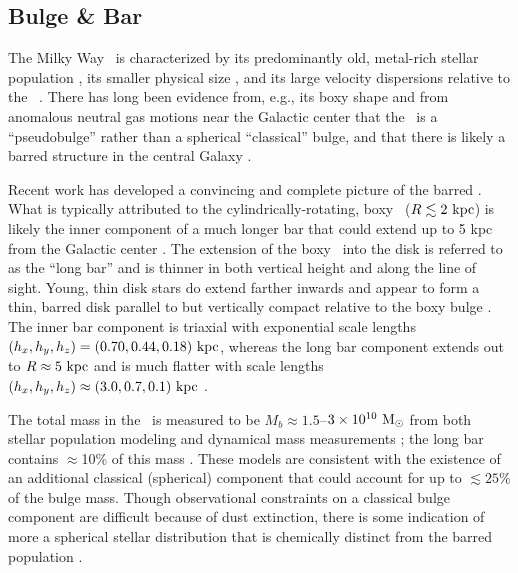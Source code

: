 \subsection{Bulge \& Bar}

The Milky Way \mwbulge\ is characterized by its predominantly old, metal-rich
stellar population \citep[$t_{\rm age} \gtrsim 10~{\rm Gyr}$, ${[{\rm Fe}/{\rm
H}]} \gtrsim -1$;][]{zoccali03}, its smaller physical size \citep[$R \lesssim
1$--$2~\kpc$;][]{binney97}, and its large velocity dispersions relative to the
\mwdisk\ \citep[$\sigma_v \sim 100~\kms$;][]{ness13b}. There has long been
evidence from, e.g., its boxy shape and from anomalous neutral gas motions near
the Galactic center that the \mwbulge\ is a ``pseudobulge'' rather than a
spherical ``classical'' bulge, and that there is likely a barred structure in
the central Galaxy \citep{blitz91, binney91, weiland94, binney97}.

Recent work has developed a convincing and complete picture of the barred
\mwbulge. What is typically attributed to the cylindrically-rotating, boxy
\mwbulge\ ($R \lesssim 2~\mathrm{kpc}$) is likely the inner component of a much longer
bar that could extend up to 5 kpc from the Galactic center \citep{wegg13,
wegg15}. The extension of the boxy \mwbulge\ into the disk is referred to as the
``long bar'' and is thinner in both vertical height and along the line of sight.
Young, thin disk stars do extend farther inwards and appear to form a thin,
barred disk parallel to but vertically compact relative to the boxy bulge
\citep{dekany15}. The inner bar component is triaxial with exponential scale
lengths $(h_x, h_y, h_z) = (0.70, 0.44, 0.18)~\mathrm{kpc}$, whereas the long bar
component extends out to $R\approx 5~\mathrm{kpc}$ and is much flatter with scale
lengths $(h_x, h_y, h_z) \approx (3.0, 0.7, 0.1)~\mathrm{kpc}$ \citep{wegg15}.


The total mass in the \mwbulge\ is measured to be $M_b \approx 1.5$--$3 \times
10^{10}~\mathrm{M}_\odot$ from both stellar population modeling \citep{dwek95, valenti15}
and dynamical mass measurements \citep{zhao95, portail15}; the long bar contains
$\approx$10\% of this mass \citep{wegg15}. These models are consistent with the
existence of an additional classical (spherical) component that could account
for up to $\lesssim 25\%$ of the bulge mass. Though observational constraints on
a classical bulge component are difficult because of dust extinction, there is
some indication of more a spherical stellar distribution that is chemically
distinct from the barred population \citep{ness13a,ness13b}.

